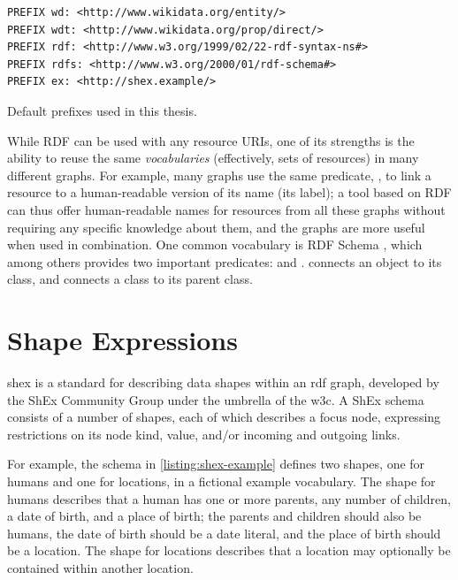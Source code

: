 \begin{lstfloat}
\begin{lstlisting}[language=sparql]
PREFIX wd: <http://www.wikidata.org/entity/>
PREFIX wdt: <http://www.wikidata.org/prop/direct/>
PREFIX rdf: <http://www.w3.org/1999/02/22-rdf-syntax-ns#>
PREFIX rdfs: <http://www.w3.org/2000/01/rdf-schema#>
PREFIX ex: <http://shex.example/>
\end{lstlisting}
\caption{Default prefixes used in this thesis.}
\label{listing:prefixes}
\end{lstfloat}

While RDF can be used with any resource URIs,
one of its strengths is the ability to reuse the same \emph{vocabularies}
(effectively, sets of resources)
in many different graphs.
For example, many graphs use the same predicate, ,
to link a resource to a human-readable version of its name (its label);
a tool based on RDF can thus offer human-readable names for resources from all these graphs
without requiring any specific knowledge about them,
and the graphs are more useful when used in combination.
One common vocabulary is RDF Schema \cite{Guha:14:RS}, %
which among others provides two important predicates:
 and .
 connects an object to its class,
and  connects a class to its parent class.


\section{Shape Expressions}
\label{sec:Background:ShEx}

\acrfull{shex} \cite{shex}
is a standard for describing data shapes within an \gls{rdf} graph,
developed by the ShEx Community Group under the umbrella of the \gls{w3c}.
A ShEx schema consists of a number of shapes,
each of which describes a focus node,
expressing restrictions on its node kind, value, and/or incoming and outgoing links.

For example, the schema in \cref{listing:shex-example} defines two shapes,
one for humans and one for locations,
in a fictional example vocabulary.
The shape for humans describes that a human has one or more parents,
any number of children,
a date of birth,
and a place of birth;
the parents and children should also be humans,
the date of birth should be a date literal,
and the place of birth should be a location.
The shape for locations describes that a location may optionally be contained within another location.

